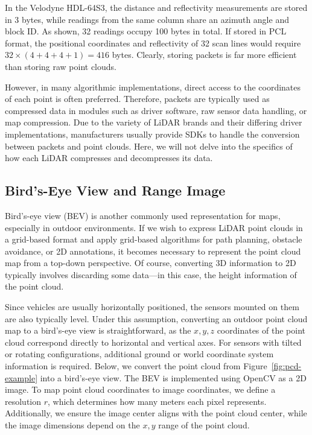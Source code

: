 In the Velodyne HDL-64S3, the distance and reflectivity measurements are stored in 3 bytes, while readings from the same column share an azimuth angle and block ID. As shown, 32 readings occupy 100 bytes in total. If stored in PCL format, the positional coordinates and reflectivity of 32 scan lines would require $32 \times (4 + 4 + 4 + 1) = 416$ bytes. Clearly, storing packets is far more efficient than storing raw point clouds.  

However, in many algorithmic implementations, direct access to the coordinates of each point is often preferred. Therefore, packets are typically used as compressed data in modules such as driver software, raw sensor data handling, or map compression. Due to the variety of LiDAR brands and their differing driver implementations, manufacturers usually provide SDKs to handle the conversion between packets and point clouds. Here, we will not delve into the specifics of how each LiDAR compresses and decompresses its data.

\subsection{Bird's-Eye View and Range Image}  
Bird's-eye view (BEV) is another commonly used representation for maps, especially in outdoor environments. If we wish to express LiDAR point clouds in a grid-based format and apply grid-based algorithms for path planning, obstacle avoidance, or 2D annotations, it becomes necessary to represent the point cloud map from a top-down perspective. Of course, converting 3D information to 2D typically involves discarding some data—in this case, the height information of the point cloud.  

Since vehicles are usually horizontally positioned, the sensors mounted on them are also typically level. Under this assumption, converting an outdoor point cloud map to a bird's-eye view is straightforward, as the $x, y, z$ coordinates of the point cloud correspond directly to horizontal and vertical axes. For sensors with tilted or rotating configurations, additional ground or world coordinate system information is required. Below, we convert the point cloud from Figure~\ref{fig:pcd-example} into a bird's-eye view. The BEV is implemented using OpenCV as a 2D image. To map point cloud coordinates to image coordinates, we define a resolution $r$, which determines how many meters each pixel represents. Additionally, we ensure the image center aligns with the point cloud center, while the image dimensions depend on the $x, y$ range of the point cloud.  


